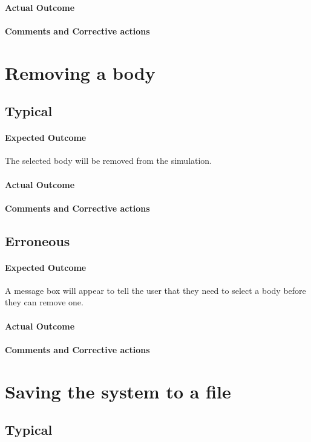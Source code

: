 \paragraph{Actual Outcome}
\paragraph{Comments and Corrective actions}


\section{Removing a body}
\subsection{Typical}
\paragraph{Expected Outcome}
The selected body will be removed from the simulation.
\paragraph{Actual Outcome}
\paragraph{Comments and Corrective actions}

\subsection{Erroneous}
\paragraph{Expected Outcome}
A message box will appear to tell the user that they need to select a body
before they can remove one.
\paragraph{Actual Outcome}
\paragraph{Comments and Corrective actions}


\section{Saving the system to a file}
\subsection{Typical}
